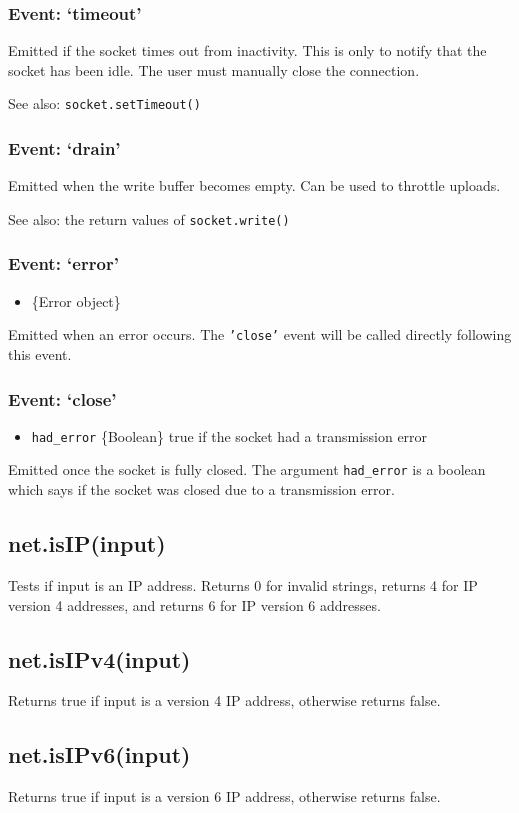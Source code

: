 \subsubsection{Event: `timeout'}

Emitted if the socket times out from inactivity. This is only to notify
that the socket has been idle. The user must manually close the
connection.

See also: \texttt{socket.setTimeout()}

\subsubsection{Event: `drain'}

Emitted when the write buffer becomes empty. Can be used to throttle
uploads.

See also: the return values of \texttt{socket.write()}

\subsubsection{Event: `error'}

\begin{itemize}
\item
  \{Error object\}
\end{itemize}

Emitted when an error occurs. The \texttt{'close'} event will be called
directly following this event.

\subsubsection{Event: `close'}

\begin{itemize}
\item
  \texttt{had\_error} \{Boolean\} true if the socket had a transmission
  error
\end{itemize}

Emitted once the socket is fully closed. The argument
\texttt{had\_error} is a boolean which says if the socket was closed due
to a transmission error.

\subsection{net.isIP(input)}

Tests if input is an IP address. Returns 0 for invalid strings, returns
4 for IP version 4 addresses, and returns 6 for IP version 6 addresses.

\subsection{net.isIPv4(input)}

Returns true if input is a version 4 IP address, otherwise returns
false.

\subsection{net.isIPv6(input)}

Returns true if input is a version 6 IP address, otherwise returns
false.
